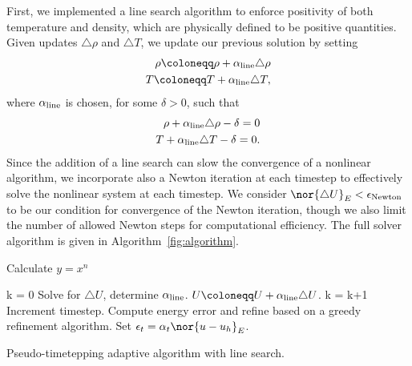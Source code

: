 First, we implemented a line search algorithm to enforce positivity of both temperature and density, which are physically defined to be positive quantities.  Given updates $\triangle \rho$ and $\triangle T$, we update our previous solution by setting 
\begin{align*}
\rho \coloneqq \rho + \alpha_{\rm line}\triangle \rho \\
T \coloneqq T + \alpha_{\rm line}\triangle T,
\end{align*}
where $\alpha_{\rm line}$ is chosen, for some $\delta > 0$, such that
\begin{align*}
\rho + \alpha_{\rm line}\triangle \rho - \delta = 0\\
T + \alpha_{\rm line}\triangle T  - \delta = 0.
\end{align*}
Since the addition of a line search can slow the convergence of a nonlinear algorithm, we incorporate also a Newton iteration at each timestep to effectively solve the nonlinear system at each timestep.  We consider $\nor{\triangle U}_E < \epsilon_{\rm Newton}$ to be our condition for convergence of the Newton iteration, though we also limit the number of allowed Newton steps for computational efficiency.  The full solver algorithm is given in Algorithm~\ref{fig:algorithm}.  
\begin{algorithm}                      %
\caption{Calculate $y = x^n$}          %
\label{alg1}                           %
\begin{algorithmic}                    %
        \STATE k = 0
            \STATE Solve for $\triangle U$, determine $\alpha_{\rm line}$.  
            \STATE $U \coloneqq U + \alpha_{\rm line}\triangle U$.  
            \STATE k = k+1
        \ENDWHILE
        \STATE Increment timestep.  
    \ENDWHILE
    \STATE Compute energy error and refine based on a greedy refinement algorithm.
    \STATE Set $\epsilon_t = \alpha_t \nor{u-u_h}_E$.    
\ENDFOR
\end{algorithmic}
\caption{Pseudo-timetepping adaptive algorithm with line search.}
\label{fig:algorithm}
\end{algorithm}
